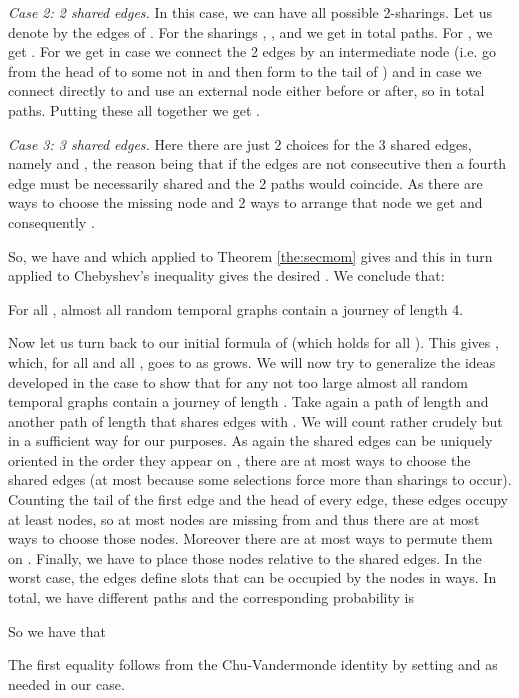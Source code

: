 \documentclass[oribibl, 11pt]{llncs}
\begin{document}
\emph{Case 2: 2 shared edges.} In this case, we can have all possible  2-sharings. Let us denote by  the edges of . For the sharings , , and  we get in total  paths. For ,  we get . For  we get  in case we connect the 2 edges by an intermediate node (i.e. go from the head of  to some  not in  and then form  to the tail of ) and  in case we connect  directly to  and use an external node either before or after, so in total  paths. Putting these all together we get .

\emph{Case 3: 3 shared edges.} Here there are just 2 choices for the 3 shared edges, namely  and , the reason being that if the edges are not consecutive then a fourth edge must be necessarily shared and the 2 paths would coincide. As there are  ways to choose the missing node and 2 ways to arrange that node we get  and consequently .

So, we have  and  which applied to Theorem \ref{the:secmom} gives  and this in turn applied to Chebyshev's inequality gives the desired . We conclude that:

\begin{theorem}
For all , almost all random temporal graphs contain a journey of length 4.
\end{theorem}

Now let us turn back to our initial  formula of  (which holds for all ). This gives , which, for all  and all , goes to  as  grows. We will now try to generalize the ideas developed in the  case to show that for any not too large  almost all random temporal graphs contain a journey of length . Take again a path  of length  and another path  of length  that shares  edges with . We will count rather crudely but in a sufficient way for our purposes. As again the shared edges can be uniquely oriented in the order they appear on , there are at most  ways to choose the shared edges (at most because some selections force more than  sharings to occur). Counting the tail of the first edge and the head of every edge, these  edges occupy at least  nodes, so at most  nodes are missing from  and thus there are at most  ways to choose those nodes. Moreover there are at most  ways to permute them on . Finally, we have to place those nodes relative to the  shared edges. In the worst case, the  edges define  slots that can be occupied by the nodes in  ways. In total, we have  different paths and the corresponding probability is 

So we have that

The first equality follows from the Chu-Vandermonde identity  by setting  and  as needed in our case.
\end{document}
